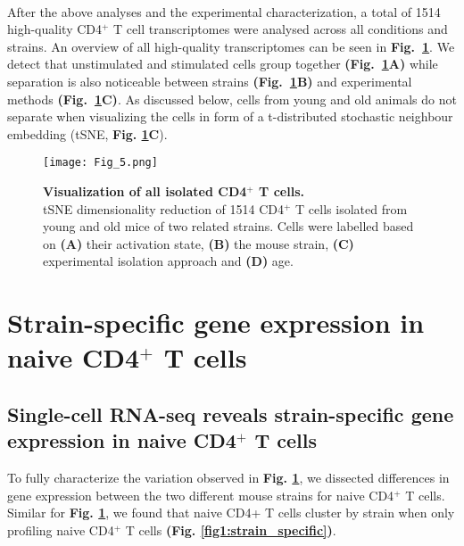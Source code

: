 {\\}
\captionsetup[figure]{list=yes}

After the above analyses and the experimental characterization, a total of 1514 high-quality CD4$^+$ T cell transcriptomes were analysed across all conditions and strains. An overview of all high-quality transcriptomes can be seen in \textbf{Fig.~\ref{fig1:all_cells}}. We detect that unstimulated and stimulated cells group together \textbf{(Fig.~\ref{fig1:all_cells}A)} while separation is also noticeable between strains \textbf{(Fig.~\ref{fig1:all_cells}B)} and experimental methods \textbf{(Fig.~\ref{fig1:all_cells}C)}. As discussed below, cells from young and old animals do not separate when visualizing the cells in form of a t-distributed stochastic neighbour embedding (tSNE, \textbf{Fig. \ref{fig1:all_cells}C}). 

\newpage

\begin{figure}[!hb]
\centering
\texttt{[image: Fig\_5.png]}
\caption[Visualization of all isolated CD4$^+$ T cells]{\textbf{Visualization of all isolated CD4$^+$ T cells.}\\
tSNE dimensionality reduction of 1514 CD4$^+$ T cells isolated from young and old mice of two related strains. Cells were labelled based on \textbf{(A)} their activation state, \textbf{(B)} the mouse strain, \textbf{(C)} experimental isolation approach and \textbf{(D)} age.}
\label{fig1:all_cells}
\end{figure}

\newpage

\section{Strain-specific gene expression in naive CD4$^+$ T cells}
\subsection*{Single-cell RNA-seq reveals strain-specific gene expression in naive CD4$^+$ T cells}

To fully characterize the variation observed in \textbf{Fig. \ref{fig1:all_cells}}, we dissected differences in gene expression between the two different mouse strains for naive CD4$^+$ T cells. Similar for \textbf{Fig. \ref{fig1:all_cells}}, we found that naive CD4+ T cells cluster by strain when only profiling naive CD4$^+$ T cells \textbf{(Fig. \ref{fig1:strain_specific})}.

